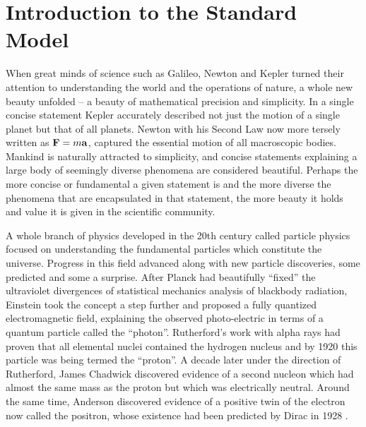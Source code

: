 
\chapter{Introduction to the Standard Model}
\label{Chapter 1} 
\captionsetup{justification=justified,singlelinecheck=false}




When great minds of science such as Galileo, Newton and Kepler turned their attention to understanding the world and the operations of nature, a whole new beauty unfolded -- a beauty of mathematical precision and simplicity. In a single concise statement Kepler accurately described not just the motion of a single planet but that of all planets. Newton with his Second Law now more tersely written as ${\bf{F}}=m{\bf{a}}$, captured the essential motion of all macroscopic bodies. Mankind is naturally attracted to simplicity, and concise statements explaining a large body of seemingly diverse phenomena are considered beautiful. Perhaps the more concise or fundamental a given statement is and the more diverse the phenomena that are encapsulated in that statement, the more beauty it holds and value it is given in the scientific community. 

A whole branch of physics developed in the 20th century called particle physics focused on understanding the fundamental particles which constitute the universe. Progress in this field advanced along with new particle discoveries, some predicted and some a surprise. After Planck had beautifully ``fixed'' the ultraviolet divergences of statistical mechanics analysis of blackbody radiation, Einstein took the concept a step further and proposed a fully quantized electromagnetic field, explaining the observed photo-electric in terms of a quantum particle called the ``photon''. Rutherford's work with alpha rays had proven that all elemental nuclei contained the hydrogen nucleus and by 1920 this particle was being termed the ``proton''. A decade later under the direction of Rutherford, James Chadwick discovered evidence of a second nucleon which had almost the same mass as the proton but which was electrically neutral. Around the same time, Anderson discovered evidence of a positive twin of the electron now called the positron, whose existence had been predicted by Dirac in 1928 \cite{Dirac}. 

